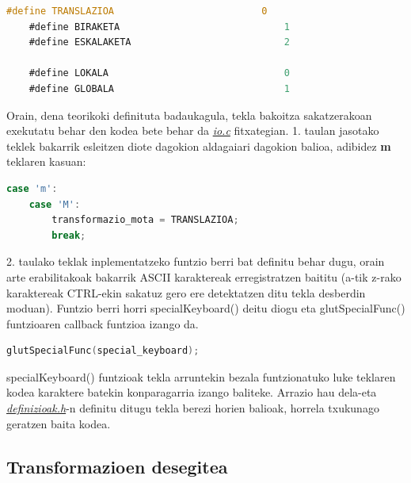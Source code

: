 \documentclass[12pt]{article}
\newcommand{\fitxategi}[1] {\underline{\textit{#1}}}
\newcommand{\tekla}[1] {\textbf{#1}}
\begin{document}
\begin{center}
	\begin{lstlisting}[language=C, basicstyle=\footnotesize]
	#define TRANSLAZIOA                          0
	#define BIRAKETA                             1
	#define ESKALAKETA                           2
	
	#define LOKALA                               0
	#define GLOBALA                              1
	\end{lstlisting}
\end{center}


Orain, dena teorikoki definituta badaukagula, tekla bakoitza sakatzerakoan exekutatu behar den kodea bete behar da \fitxategi{io.c} fitxategian. 1. taulan jasotako teklek bakarrik esleitzen diote dagokion aldagaiari dagokion balioa, adibidez \tekla{m} teklaren kasuan:

\begin{center}
	\begin{lstlisting}[language=C, basicstyle=\footnotesize]
	case 'm':
	case 'M':
		transformazio_mota = TRANSLAZIOA;
		break;
	\end{lstlisting}
\end{center}


2. taulako teklak inplementatzeko funtzio berri bat definitu behar dugu, orain arte erabilitakoak bakarrik ASCII karaktereak erregistratzen baititu (a-tik z-rako karaktereak CTRL-ekin sakatuz gero ere detektatzen ditu tekla desberdin moduan).
Funtzio berri horri specialKeyboard() deitu diogu eta glutSpecialFunc()\cite{glutSpecialFunc} funtzioaren callback funtzioa\cite{callback} izango da.

\begin{center}
	\begin{lstlisting}[language=C, basicstyle=\footnotesize]
	glutSpecialFunc(special_keyboard);
	\end{lstlisting}
\end{center}

specialKeyboard() funtzioak tekla arruntekin bezala funtzionatuko luke teklaren kodea karaktere batekin konparagarria izango baliteke. Arrazio hau dela-eta \fitxategi{definizioak.h}-n definitu ditugu tekla berezi horien balioak, horrela txukunago geratzen baita kodea.




\subsection{Transformazioen desegitea}
\end{document}
